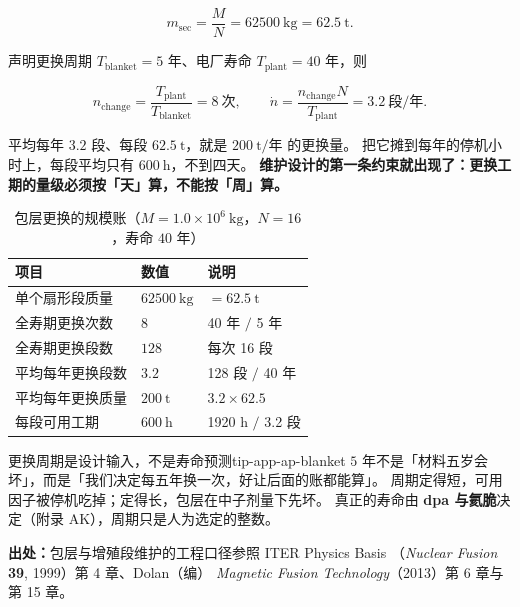\begin{equation}
m_{\text{sec}} = \frac{M}{N} = 62500\ \mathrm{kg} = 62.5\ \mathrm{t}.
\label{eq:app-ap-sector}
\end{equation}

声明更换周期 $T_{\text{blanket}} = 5$ 年、电厂寿命 $T_{\text{plant}} = 40$ 年，则

\begin{equation}
n_{\text{change}} = \frac{T_{\text{plant}}}{T_{\text{blanket}}} = 8\ \text{次},
\qquad
\dot n = \frac{n_{\text{change}} N}{T_{\text{plant}}} = 3.2\ \text{段}/\text{年}.
\label{eq:app-ap-campaign}
\end{equation}

平均每年 $3.2$ 段、每段 $62.5\ \mathrm{t}$，就是 $200\ \mathrm{t}/$年 的更换量。
把它摊到每年的停机小时上，每段平均只有 $600\ \mathrm{h}$，不到四天。
\textbf{维护设计的第一条约束就出现了：更换工期的量级必须按「天」算，不能按「周」算。}

\begin{table}[htbp]
\centering
\small
\caption{包层更换的规模账（$M = 1.0\times10^{6}\ \mathrm{kg}$，$N = 16$，寿命 $40$ 年）}
\label{tab:app-ap-blanket}
\setlength{\tabcolsep}{4pt}
\begin{tabular}{p{5.6cm}p{4.4cm}p{5.6cm}}
\toprule
项目 & 数值 & 说明 \\
\midrule
单个扇形段质量 & $62500\ \mathrm{kg}$ & $= 62.5\ \mathrm{t}$ \\
全寿期更换次数 & $8$ & 40 年 $/$ 5 年 \\
全寿期更换段数 & $128$ & 每次 16 段 \\
平均每年更换段数 & $3.2$ & 128 段 $/$ 40 年 \\
平均每年更换质量 & $200\ \mathrm{t}$ & $3.2 \times 62.5$ \\
每段可用工期 & $600\ \mathrm{h}$ & 1920 h $/$ 3.2 段 \\
\bottomrule
\end{tabular}
\end{table}

\begin{tip}{更换周期是设计输入，不是寿命预测}{tip-app-ap-blanket}
$5$ 年不是「材料五岁会坏」，而是「我们决定每五年换一次，好让后面的账都能算」。
周期定得短，可用因子被停机吃掉；定得长，包层在中子剂量下先坏。
真正的寿命由 \textbf{dpa 与氦脆}决定（附录 AK），周期只是人为选定的整数。
\end{tip}

{\footnotesize
\textbf{出处：}包层与增殖段维护的工程口径参照 ITER Physics Basis
（\textit{Nuclear Fusion} \textbf{39}, 1999）第 4 章、Dolan（编）
\textit{Magnetic Fusion Technology}（2013）第 6 章与第 15 章。
}

